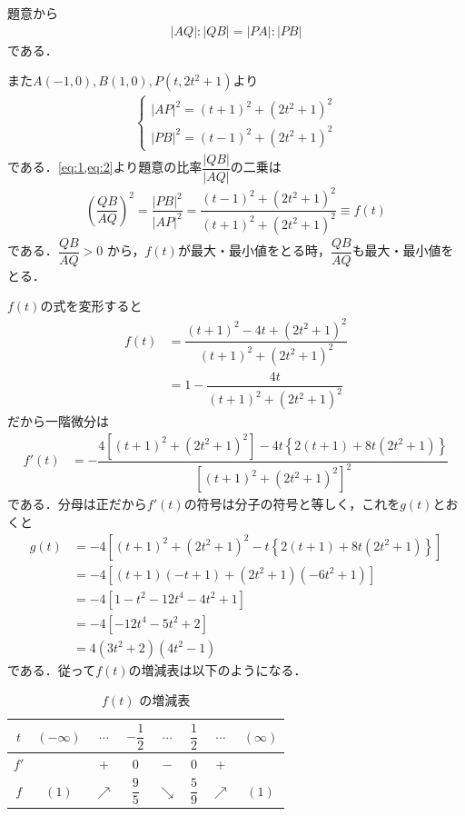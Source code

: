 \documentclass[../../main.tex]{subfiles}
\begin{document}
題意から
\begin{align}
  |AQ| : |QB| = |PA| : |PB| \label{eq:1}
\end{align}
である．

また$A(-1,0), B(1,0), P(t,2t^2+1)$より
\begin{align}
  \begin{cases}
    |AP|^2 = (t+1)^2 + (2t^2+1)^2 \\
    |PB|^2 = (t-1)^2 + (2t^2+1)^2
  \end{cases} \label{eq:2}
\end{align}
である．\cref{eq:1,eq:2}より題意の比率$\dfrac{|QB|}{|AQ|}$の二乗は
\begin{align}
  \left(\dfrac{QB}{AQ}\right)^2
  = \dfrac{|PB|^2}{|AP|^2}
  = \dfrac{(t-1)^2 + (2t^2+1)^2}{(t+1)^2 + (2t^2+1)^2} \equiv f(t)
\end{align}
である．$\dfrac{QB}{AQ} > 0$ から，$f(t)$が最大・最小値をとる時，$\dfrac{QB}{AQ}$も最大・最小値をとる．

$f(t)$の式を変形すると
\begin{align}
  f(t)
  & = \dfrac{(t+1)^2 - 4t + (2t^2+1)^2}{(t+1)^2 + (2t^2+1)^2} \\
  & = 1 - \dfrac{4t}{(t+1)^2 + (2t^2+1)^2}
\end{align}
だから一階微分は
\begin{align}
  f'(t)
  &= -\dfrac{4\left[(t+1)^2 + (2t^2+1)^2\right]-4t\left\{2(t+1)+8t(2t^2+1)\right\}}{\left[(t+1)^2 + (2t^2+1)^2\right]^2}
\end{align}
である．分母は正だから$f'(t)$の符号は分子の符号と等しく，これを$g(t)$とおくと
\begin{align}
  g(t)
  &= -4\left[(t+1)^2 + (2t^2+1)^2-t\left\{2(t+1)+8t(2t^2+1)\right\}\right] \\
  &= -4\left[(t+1)(-t+1) + (2t^2+1)(-6t^2+1)\right] \\
  &= -4\left[1-t^2 -12t^4-4t^2+1 \right] \\
  &= -4\left[-12t^4-5t^2+2 \right] \\
  &= 4(3t^2+2)(4t^2-1)
\end{align}
である．従って$f(t)$の増減表は以下のようになる．

\begin{table}[htb]
  \centering
  \caption{$f(t)$ の増減表}
  \begin{tabular}{|c|c|c|c|c|c|c|c|}
    \hline
    $t$ & $(-\infty)$ & $\cdots$ & $-\dfrac{1}{2}$ & $\cdots$ & $\dfrac{1}{2}$ & $\cdots$ & $(\infty)$ \\
    \hline
    $f'$ & & $+$ & $0$ & $-$ & $0$ & $+$ & \\
    \hline
    $f$ & $(1)$ & $\nearrow$ & $\dfrac{9}{5}$ & $\searrow$ & $\dfrac{5}{9}$ & $\nearrow$ & $(1)$ \\
    \hline
  \end{tabular}
\end{table}
\end{document}
